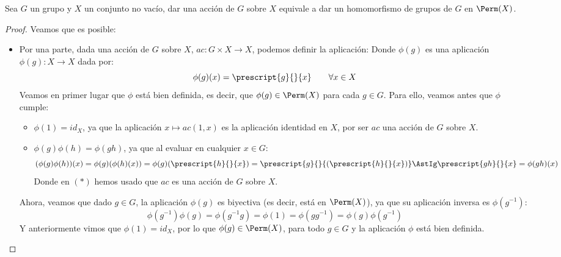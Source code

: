 \begin{prop}
    Sea $G$ un grupo y $X$ un conjunto no vacío, dar una acción de $G$ sobre $X$ equivale a dar un homomorfismo de grupos de $G$ en $\Perm(X)$.
    \begin{proof}
        Veamos que es posible:
        \begin{itemize}
            \item Por una parte, dada una acción de $G$ sobre $X$, $ac:G\times X \to X$, podemos definir la aplicación: 
                Donde $\phi(g)$ es una aplicación $\phi(g):X\longrightarrow X$ dada por:
                \begin{equation*}
                    \phi(g)(x) = \prescript{g}{}{x} \qquad \forall x\in X
                \end{equation*}
                Veamos en primer lugar que $\phi$ está bien definida, es decir, que $\phi(g) \in \Perm(X)$ para cada $g\in G$. Para ello, veamos antes que $\phi$ cumple:
                \begin{itemize}
                    \item $\phi(1) = id_X$, ya que la aplicación $x\mapsto ac(1,x)$ es la aplicación identidad en $X$, por ser $ac$ una acción de $G$ sobre $X$.
                    \item $\phi(g)\phi(h) = \phi(gh)$, ya que al evaluar en cualquier $x\in G$:
                        \begin{equation*}
                            (\phi(g)\phi(h))(x) = \phi(g)(\phi(h)(x)) = \phi(g)(\prescript{h}{}{x}) = \prescript{g}{}{(\prescript{h}{}{x})} \AstIg \prescript{gh}{}{x} = \phi(gh)(x)
                        \end{equation*}
                        Donde en $(\ast)$ hemos usado que $ac$ es una acción de $G$ sobre $X$.
                \end{itemize}
                Ahora, veamos que dado $g\in G$, la aplicación $\phi(g)$ es biyectiva (es decir, está en $\Perm(X)$), ya que su aplicación inversa es $\phi(g^{-1})$:
                \begin{equation*}
                    \phi(g^{-1})\phi(g) = \phi(g^{-1}g) = \phi(1) = \phi(gg^{-1}) = \phi(g) \phi(g^{-1})
                \end{equation*}
                Y anteriormente vimos que $\phi(1) = id_X$, por lo que $\phi(g) \in \Perm(X)$, para todo $g\in G$ y la aplicación $\phi$ está bien definida.\\


\end{itemize}
\end{proof}
\end{prop}
